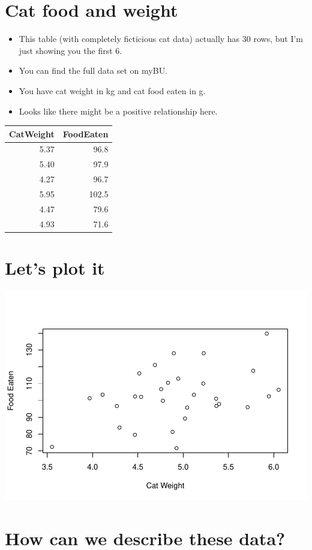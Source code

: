 \documentclass[]{article}
\providecommand{\tightlist}{%
  \setlength{\itemsep}{0pt}\setlength{\parskip}{0pt}}
\begin{document}
\section{Cat food and weight}\label{cat-food-and-weight}

\begin{itemize}
\tightlist
\item
  This table (with completely ficticious cat data) actually has 30 rows,
  but I'm just showing you the first 6.
\item
  You can find the full data set on myBU.
\item
  You have cat weight in kg and cat food eaten in g.
\item
  Looks like there might be a positive relationship here.
\end{itemize}

\begin{longtable}[]{@{}rr@{}}
\toprule
CatWeight & FoodEaten\tabularnewline
\midrule
\endhead
5.37 & 96.8\tabularnewline
5.40 & 97.9\tabularnewline
4.27 & 96.7\tabularnewline
5.95 & 102.5\tabularnewline
4.47 & 79.6\tabularnewline
4.93 & 71.6\tabularnewline
\bottomrule
\end{longtable}

\section{Let's plot it}\label{lets-plot-it}

\includegraphics{Basics_of_Regression_files/figure-latex/unnamed-chunk-3-1.pdf}

\section{How can we describe these
data?}\label{how-can-we-describe-these-data}
\end{document}
